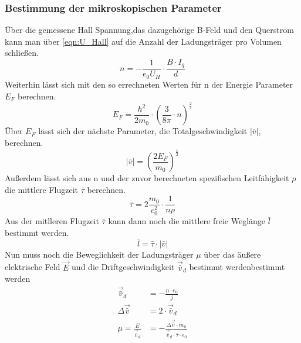 \subsubsection{Bestimmung der mikroskopischen Parameter}
Über die gemessene Hall Spannung,das dazugehörige B-Feld und den Querstrom kann man über \ref{eqn:U_Hall} auf die Anzahl der Ladungsträger pro Volumen schließen.
\begin{equation*}
    n = -\frac{1}{e_0 U_H}\cdot \frac{B\cdot I_q}{d}
\end{equation*}
Weiterhin lässt sich mit den so errechneten Werten für n der Energie Parameter $E_F$ berechnen.
\begin{equation*}
    E_F = \frac{h^2}{2 m_0}\cdot \left(\frac{3}{8\pi}\cdot n \right)^{\frac{2}{3}}
\end{equation*}
Über $E_F$ lässt sich der nächste Parameter, die Totalgeschwindigkeit $|\bar{v}|$, berechnen.
\begin{equation*}
    |\bar{v}| = \left(\frac{2 E_F}{m_0}\right)^{\frac{1}{2}}
\end{equation*}
Außerdem lässt sich aus n und der zuvor berechneten spezifischen Leitfähigkeit $\rho$ die mittlere Flugzeit $\bar{\tau}$ berechnen.
\begin{equation*}
    \bar{\tau} = 2 \frac{m_0}{e_0^2} \cdot \frac{1}{n \rho}
\end{equation*}
Aus der mitlleren Flugzeit $\bar{\tau}$ kann dann noch die mittlere freie Weglänge $\bar{l}$ bestimmt werden.
\begin{equation*}
    \bar{l} = \bar{\tau} \cdot |\bar{v}|
\end{equation*}
Nun muss noch die Beweglichkeit der Ladungsträger $\mu$ über das äußere elektrische Feld $\vec{E}$ und die Driftgeschwindigkeit $\vec{\bar{v}}_d$ bestimmt werdenbestimmt werden
\begin{align*}
    \vec{\bar{v}}_d &= -\frac{n \cdot e_0}{j} \\
    \Delta \vec{\bar{v}} &= 2\cdot \vec{\bar{v}}_d\\
    \mu = \frac{E}{\vec{\bar{v}}_d} &= - \frac{\Delta \vec{\bar{v}}\cdot m_0 }{\vec{\bar{v}}_d \cdot \bar{\tau} \cdot e_0}\\
\end{align*}

